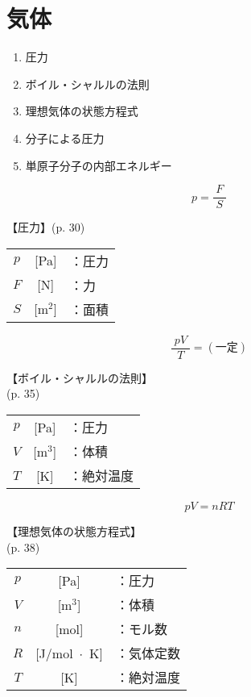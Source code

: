 \documentclass[10pt]{jarticle}
\begin{document}
\newpage
\addtocounter{page}{-1}
\thispagestyle{empty}
\section{気体}


\begin{enumerate}
\setcounter{enumi}{\thepage}
\small
\itemsep-4mm
\item 圧力\\
\item ボイル・シャルルの法則\\
\item 理想気体の状態方程式\\
\item 分子による圧力\\
\item 単原子分子の内部エネルギー\\
\end{enumerate}






\newpage
\[
	p = \frac{F}{\; S \;}
\]


\vskip3mm
【圧力】{\footnotesize (p. 30)}

\begin{tabular}{ccl}
$p$	&[Pa]	&：圧力\\
$F$	&[N]	&：力\\
$S$	&[m$^2$]	&：面積
\end{tabular}



\newpage
\[
	\frac{\; pV \;}{T}= (一定)
\]


\vskip3mm
【ボイル・シャルルの法則】\\
\hfill {\footnotesize (p. 35)}

\begin{tabular}{ccl}
$p$	&[Pa]	&：圧力\\
$V$	&[m$^3$]	&：体積\\
$T$	&[K]	&：絶対温度
\end{tabular}




\newpage
\[
	p V = n R T
\]


\vskip3mm
【理想気体の状態方程式】\\
\hfill {\footnotesize (p. 38)}

\begin{tabular}{ccl}
$p$	&[Pa]	&：圧力\\
$V$	&[m$^3$]	&：体積\\
$n$	&[mol]	&：モル数\\
$R$	&[J/mol $\!\! \cdot \!\! $ K]	&：気体定数\\
$T$	&[K]	&：絶対温度
\end{tabular}
\end{document}
